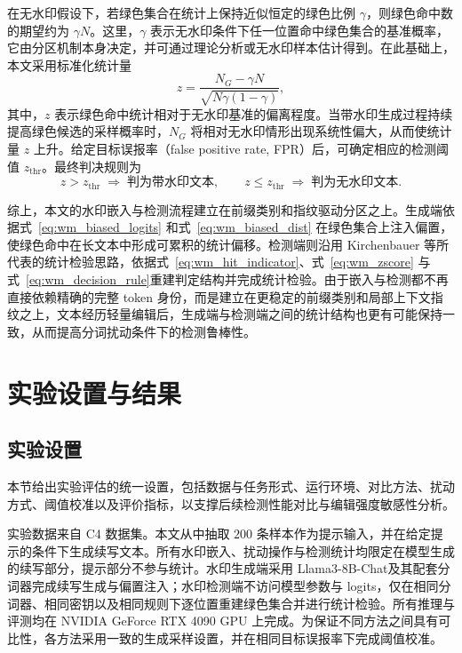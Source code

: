 在无水印假设下，若绿色集合在统计上保持近似恒定的绿色比例 $\gamma$，则绿色命中数的期望约为 $\gamma N$。这里，$\gamma$ 表示无水印条件下任一位置命中绿色集合的基准概率，它由分区机制本身决定，并可通过理论分析或无水印样本估计得到。在此基础上，本文采用标准化统计量
\begin{equation}
z=\frac{N_G-\gamma N}{\sqrt{N\gamma(1-\gamma)}},
\label{eq:wm_zscore}
\end{equation}
其中，$z$ 表示绿色命中统计相对于无水印基准的偏离程度。当带水印生成过程持续提高绿色候选的采样概率时，$N_G$ 将相对无水印情形出现系统性偏大，从而使统计量 $z$ 上升。给定目标误报率（false positive rate, FPR）后，可确定相应的检测阈值 $z_{\mathrm{thr}}$。最终判决规则为
\begin{equation}
z>z_{\mathrm{thr}}
\;\Rightarrow\;
\text{判为带水印文本},
\qquad
z\le z_{\mathrm{thr}}
\;\Rightarrow\;
\text{判为无水印文本}.
\label{eq:wm_decision_rule}
\end{equation}

综上，本文的水印嵌入与检测流程建立在前缀类别和指纹驱动分区之上。生成端依据式~\eqref{eq:wm_biased_logits} 和式~\eqref{eq:wm_biased_dist} 在绿色集合上注入偏置，使绿色命中在长文本中形成可累积的统计偏移。检测端则沿用 Kirchenbauer 等\cite{kirchenbauer2023watermark}所代表的统计检验思路，依据式~\eqref{eq:wm_hit_indicator}、式~\eqref{eq:wm_zscore} 与式~\eqref{eq:wm_decision_rule}重建判定结构并完成统计检验。由于嵌入与检测都不再直接依赖精确的完整 token 身份，而是建立在更稳定的前缀类别和局部上下文指纹之上，文本经历轻量编辑后，生成端与检测端之间的统计结构也更有可能保持一致，从而提高分词扰动条件下的检测鲁棒性。

\section{实验设置与结果}

\subsection{实验设置}

本节给出实验评估的统一设置，包括数据与任务形式、运行环境、对比方法、扰动方式、阈值校准以及评价指标，以支撑后续检测性能对比与编辑强度敏感性分析。

实验数据来自 C4 数据集\cite{raffel2020exploring}。本文从中抽取 $200$ 条样本作为提示输入，并在给定提示的条件下生成续写文本。所有水印嵌入、扰动操作与检测统计均限定在模型生成的续写部分，提示部分不参与统计。水印生成端采用 Llama3-8B-Chat\cite{grattafiori2024llama3}及其配套分词器完成续写生成与偏置注入；水印检测端不访问模型参数与 logits，仅在相同分词器、相同密钥以及相同规则下逐位置重建绿色集合并进行统计检验。所有推理与评测均在 NVIDIA GeForce RTX 4090 GPU 上完成。为保证不同方法之间具有可比性，各方法采用一致的生成采样设置，并在相同目标误报率下完成阈值校准。

